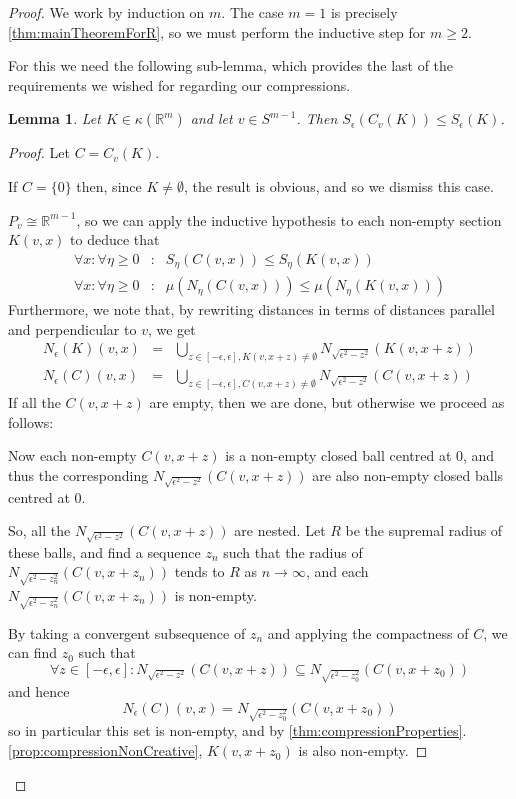 \documentclass[a4paper,11pt]{article}
\newcommand{\bbR}{\mathbb{R}}
\newcommand{\isom}{\cong}
\newtheorem{lemma}[thm]{Lemma}
\begin{document}
\begin{proof}
We work by induction on $m$.  The case $m=1$ is precisely
\ref{thm:mainTheoremForR}, so we must perform the inductive step for $m\geq2$.

For this we need the following sub-lemma, which provides the last of the
requirements we wished for regarding our compressions.

\begin{lemma}
\label{thm:compressionSurfaceAreaDecreasing}
Let $K\in\kappa(\bbR^m)$ and let $v\in S^{m-1}$.  Then
$S_\epsilon(C_v(K))\leq S_\epsilon(K)$.
\end{lemma}

\begin{proof}
Let $C=C_v(K)$.

If $C=\{0\}$ then, since $K\not=\emptyset$, the result is obvious, and so we
dismiss this case.

$P_v\isom\bbR^{m-1}$, so we can apply the inductive hypothesis to each
non-empty section $K(v,x)$ to deduce that
%
\begin{eqnarray*}
\forall x:\forall\eta\geq0 &:& S_\eta(C(v,x))\leq S_\eta(K(v,x)) \\
\forall x:\forall\eta\geq0 &:& \mu(N_\eta(C(v,x)))\leq \mu(N_\eta(K(v,x)))
\end{eqnarray*}
%
Furthermore, we note that, by rewriting distances in terms of distances
parallel and perpendicular to $v$, we get
%
\begin{eqnarray*}
N_\epsilon(K)(v,x) &=&
	\bigcup_{z\in[-\epsilon,\epsilon],K(v,x+z)\not=\emptyset}
	N_{\sqrt{\epsilon^2-z^2}}(K(v,x+z)) \\
N_\epsilon(C)(v,x) &=&
	\bigcup_{z\in[-\epsilon,\epsilon],C(v,x+z)\not=\emptyset}
	N_{\sqrt{\epsilon^2-z^2}}(C(v,x+z))
\end{eqnarray*}
%
If all the $C(v,x+z)$ are empty, then we are done, but otherwise we proceed as
follows:

Now each non-empty $C(v,x+z)$ is a non-empty closed
ball centred at $0$, and thus the corresponding
$N_{\sqrt{\epsilon^2-z^2}}(C(v,x+z))$ are also
non-empty closed balls centred at $0$.

So, all the $N_{\sqrt{\epsilon^2-z^2}}(C(v,x+z))$ are nested.  Let $R$ be the
supremal radius of these balls, and find a sequence
$z_n$ such that the radius of $N_{\sqrt{\epsilon^2-z_n^2}}(C(v,x+z_n))$ tends
to $R$ as $n\to\infty$, and each $N_{\sqrt{\epsilon^2-z_n^2}}(C(v,x+z_n))$ is
non-empty.

By taking a convergent subsequence of $z_n$ and applying the compactness of
$C$, we can find $z_0$ such that
\[
\forall z\in[-\epsilon,\epsilon]:N_{\sqrt{\epsilon^2-z^2}}(C(v,x+z))\subseteq
	N_{\sqrt{\epsilon^2-z_0^2}}(C(v,x+z_0))
\]
and hence
\[
N_\epsilon(C)(v,x)=N_{\sqrt{\epsilon^2-z_0^2}}(C(v,x+z_0))
\]
so in particular this set is non-empty, and by
\ref{thm:compressionProperties}.\ref{prop:compressionNonCreative}, $K(v,x+z_0)$
is also non-empty.


\end{proof}
\end{proof}
\end{document}
